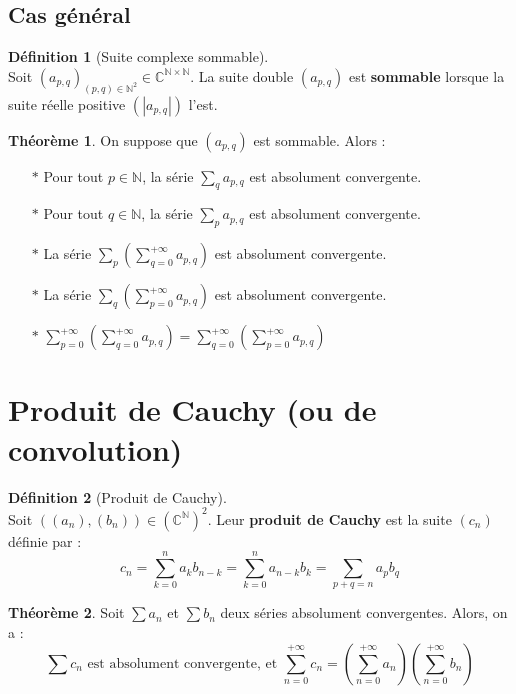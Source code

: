 \documentclass[12pt]{book}
\let\ensembleNombre\mathbb
\newcommand*\N{\ensuremath{\ensembleNombre{N}}}
\newcommand*\C{\ensuremath{\ensembleNombre{C}}}
\theoremstyle{definition}
\newtheorem*{defi}{Définition}
\newtheorem{thme}{Théorème}[chapter]
\theoremstyle{remark}
\newenvironment{fdef}
  {\begin{mdframed}[roundcorner=10pt, linewidth=1pt]\begin{defi}}
  {\end{defi}\end{mdframed}}
\newenvironment{fthme}
  {\begin{mdframed}[roundcorner=10pt, linewidth=2pt]\begin{thme}}
  {\end{thme}\end{mdframed}}
\begin{document}
	\subsection{Cas général}
	\begin{fdef}[Suite complexe sommable] \mbox{~}\\
	Soit $(a_{p,q})_{(p,q) \in \N^2} \in \C^{\N \times \N}$. La suite double $(a_{p,q})$ est \textbf{sommable} lorsque la suite réelle positive $(|a_{p,q}|)$ l'est.
	\end{fdef}
	
	\begin{fthme} On suppose que $(a_{p,q})$ est sommable. Alors :
	\begin{itemize}
	\item[$*$] Pour tout $p \in \N$, la série $\sum_q a_{p,q}$ est absolument convergente.
	\item[$*$] Pour tout $q \in \N$, la série $\sum_p a_{p,q}$ est absolument convergente.
	\item[$*$] La série $\sum_p \left( \sum_{q=0}^{+\infty} a_{p,q} \right)$ est absolument convergente.
	\item[$*$] La série $\sum_q \left( \sum_{p=0}^{+\infty} a_{p,q} \right)$ est absolument convergente.
	\item[$*$] $\sum_{p=0}^{+\infty} \left( \sum_{q=0}^{+\infty} a_{p,q} \right) = \sum_{q=0}^{+\infty} \left( \sum_{p=0}^{+\infty} a_{p,q} \right)$
	\end{itemize}
	\end{fthme}
	
	\section{Produit de Cauchy (ou de convolution) }
	\begin{fdef}[Produit de Cauchy]\mbox{~}\\
	Soit $((a_n), (b_n)) \in \left( \C^\N \right)^2$. Leur \textbf{produit de Cauchy} est la suite $(c_n)$ définie par :
	\[\boxed{c_n = \sum_{k=0}^n a_kb_{n-k} = \sum_{k=0}^n a_{n-k}b_k = \sum_{p+q=n} a_pb_q }\]
	\end{fdef}
	
	\begin{fthme} Soit $\sum a_n$ et $\sum b_n$ deux séries absolument convergentes. Alors, on a :
	\[\sum c_n \text{ est absolument convergente, et } \sum_{n=0}^{+\infty} c_n = \left( \sum_{n=0}^{+\infty} a_n \right) \left( \sum_{n=0}^{+\infty} b_n \right) \]
	\end{fthme}
	
\end{document}
